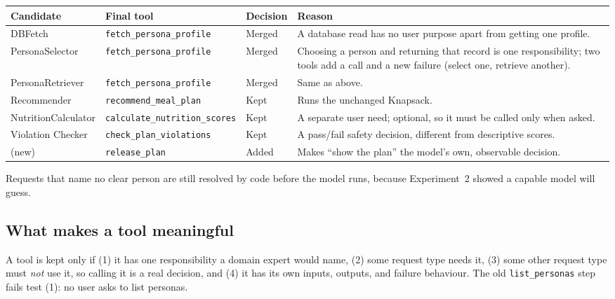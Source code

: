 \documentclass[11pt]{article}
\newcommand{\tool}[1]{\texttt{#1}}
\begin{document}
\begin{center}
\small
\begin{tabularx}{\textwidth}{@{}l l l >{\raggedright\arraybackslash}X@{}}
\toprule
Candidate & Final tool & Decision & Reason \\
\midrule
DBFetch & \tool{fetch\_persona\_profile} & Merged & A database read has no user purpose apart from getting one profile. \\
PersonaSelector & \tool{fetch\_persona\_profile} & Merged & Choosing a person and returning that record is one responsibility; two tools add a call and a new failure (select one, retrieve another). \\
PersonaRetriever & \tool{fetch\_persona\_profile} & Merged & Same as above. \\
Recommender & \tool{recommend\_meal\_plan} & Kept & Runs the unchanged Knapsack. \\
NutritionCalculator & \tool{calculate\_nutrition\_scores} & Kept & A separate user need; optional, so it must be called only when asked. \\
Violation Checker & \tool{check\_plan\_violations} & Kept & A pass/fail safety decision, different from descriptive scores. \\
(new) & \tool{release\_plan} & Added & Makes ``show the plan'' the model's own, observable decision. \\
\bottomrule
\end{tabularx}
\end{center}

Requests that name no clear person are still resolved by code before the model
runs, because Experiment~2 showed a capable model will guess.

\subsection{What makes a tool meaningful}

A tool is kept only if (1) it has one responsibility a domain expert would name,
(2) some request type needs it, (3) some other request type must \emph{not} use
it, so calling it is a real decision, and (4) it has its own inputs, outputs, and
failure behaviour. The old \tool{list\_personas} step fails test (1): no user
asks to list personas.
\end{document}
